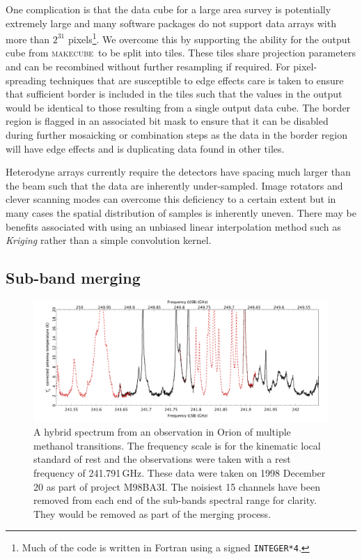 \documentclass[useAMS,usenatbib]{mn2e}
\newcommand{\makecube}{\textsc{makecube}}
\begin{document}
One complication is that the data cube for a large area survey is
potentially extremely large and many software packages do not support
data arrays with more than $2^{31}$ pixels\footnote{Much of the code
  is written in Fortran using a signed \texttt{INTEGER*4}.}. We overcome this by
supporting the ability for the output cube from \makecube\ to
be split into tiles. These tiles share projection parameters and can
be recombined without further resampling if required. For
pixel-spreading techniques that are susceptible to edge effects care is
taken to ensure that sufficient border is included in the tiles such
that the values in the output would be identical to those resulting
from a single output data cube. The border region is flagged in an
associated bit mask to ensure that it can be disabled during further
mosaicking or combination steps as the data in the border region will
have edge effects and is duplicating data found in other tiles.

Heterodyne arrays currently require the detectors have spacing much
larger than the beam such that the data are inherently
under-sampled. Image rotators and clever scanning modes can overcome
this deficiency to a certain extent but in many cases the spatial
distribution of samples is inherently uneven. There may be benefits
associated with using an unbiased linear interpolation method such as
\emph{Kriging} \citep[e.g.,][]{1990Cressie} rather than a simple
convolution kernel.

\subsection{Sub-band merging}

\begin{figure}
\begin{minipage}{\textwidth}
\includegraphics[width=\textwidth]{hybrid}
\caption{A hybrid spectrum from an observation in Orion of multiple
  methanol transitions. The frequency scale is for the kinematic local
  standard of rest and the observations were taken with a rest
  frequency of 241.791\,GHz. These data were taken on 1998 December 20
  as part of project M98BA3I. The noisiest 15 channels have been
  removed from each end of the sub-bands spectral range for
  clarity. They would be removed as part of the merging process.}
\label{fig:hybrid}
\end{minipage}
\end{figure}
\end{document}
